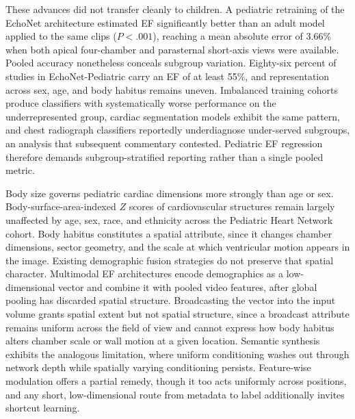 \documentclass{ws-procs11x85}
\begin{document}
These advances did not transfer cleanly to children.
A pediatric retraining of the EchoNet architecture estimated EF significantly better than an adult model applied to the same clips ($P<.001$), reaching a mean absolute error of 3.66\% when both apical four-chamber and parasternal short-axis views were available.\cite{reddy2023echonetpeds}
Pooled accuracy nonetheless conceals subgroup variation.
Eighty-six percent of studies in EchoNet-Pediatric carry an EF of at least 55\%, and representation across sex, age, and body habitus remains uneven.\cite{reddy2023echonetpeds}
Imbalanced training cohorts produce classifiers with systematically worse performance on the underrepresented group,\cite{larrazabal2020gender} cardiac segmentation models exhibit the same pattern,\cite{puyolanton2021fairness} and chest radiograph classifiers reportedly underdiagnose under-served subgroups, an analysis that subsequent commentary contested.\cite{seyyedkalantari2021underdiagnosis}
Pediatric EF regression therefore demands subgroup-stratified reporting rather than a single pooled metric.

Body size governs pediatric cardiac dimensions more strongly than age or sex.
Body-surface-area-indexed $Z$ scores of cardiovascular structures remain largely unaffected by age, sex, race, and ethnicity across the Pediatric Heart Network cohort.\cite{lopez2017zscores}
Body habitus constitutes a spatial attribute, since it changes chamber dimensions, sector geometry, and the scale at which ventricular motion appears in the image.
Existing demographic fusion strategies do not preserve that spatial character.
Multimodal EF architectures encode demographics as a low-dimensional vector and combine it with pooled video features, after global pooling has discarded spatial structure.\cite{lee2025ibignn}
Broadcasting the vector into the input volume grants spatial extent but not spatial structure, since a broadcast attribute remains uniform across the field of view and cannot express how body habitus alters chamber scale or wall motion at a given location.
Semantic synthesis exhibits the analogous limitation, where uniform conditioning washes out through network depth while spatially varying conditioning persists.\cite{park2019spade}
Feature-wise modulation offers a partial remedy, though it too acts uniformly across positions,\cite{perez2018film} and any short, low-dimensional route from metadata to label additionally invites shortcut learning.\cite{geirhos2020shortcut}
\end{document}
